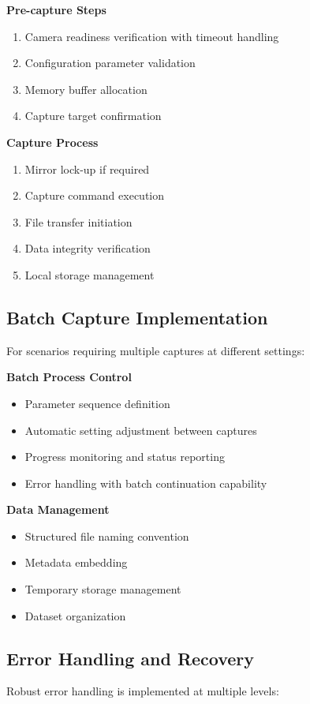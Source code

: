 \textbf{Pre-capture Steps}
\begin{enumerate}
    \item Camera readiness verification with timeout handling
    \item Configuration parameter validation
    \item Memory buffer allocation
    \item Capture target confirmation
\end{enumerate}

\textbf{Capture Process}
\begin{enumerate}
    \item Mirror lock-up if required
    \item Capture command execution
    \item File transfer initiation
    \item Data integrity verification
    \item Local storage management
\end{enumerate}

\subsection{Batch Capture Implementation}
For scenarios requiring multiple captures at different settings:

\textbf{Batch Process Control}
\begin{itemize}
    \item Parameter sequence definition
    \item Automatic setting adjustment between captures
    \item Progress monitoring and status reporting
    \item Error handling with batch continuation capability
\end{itemize}

\textbf{Data Management}
\begin{itemize}
    \item Structured file naming convention
    \item Metadata embedding
    \item Temporary storage management
    \item Dataset organization
\end{itemize}


\subsection{Error Handling and Recovery}
Robust error handling is implemented at multiple levels:

